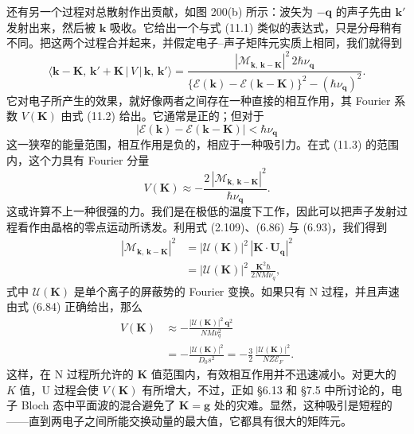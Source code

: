 还有另一个过程对总散射作出贡献，如图 200(b) 所示：波矢为 $-\mathbf{q}$ 的声子先由 $\mathbf{k}'$ 发射出来，然后被 $\mathbf{k}$ 吸收。它给出一个与式 (11.1) 类似的表达式，只是分母稍有不同。把这两个过程合并起来，并假定电子–声子矩阵元实质上相同，我们就得到
\begin{equation*}
\langle \mathbf{k}-\mathbf{K},\,\mathbf{k}'+\mathbf{K}\,|\,V\,|\,\mathbf{k},\,\mathbf{k}'\rangle
=\frac{|\mathcal{M}_{\mathbf{k},\,\mathbf{k}-\mathbf{K}}|^{2}\,2\hbar\nu_{\mathbf{q}}}{\{\mathcal{E}(\mathbf{k})-\mathcal{E}(\mathbf{k}-\mathbf{K})\}^{2}-(\hbar\nu_{\mathbf{q}})^{2}}.
\tag{11.2}
\end{equation*}
它对电子所产生的效果，就好像两者之间存在一种直接的相互作用，其 Fourier 系数 $V(\mathbf{K})$ 由式 (11.2) 给出。它通常是正的；但对于
\begin{equation*}
|\mathcal{E}(\mathbf{k})-\mathcal{E}(\mathbf{k}-\mathbf{K})|<\hbar\nu_{\mathbf{q}}
\tag{11.3}
\end{equation*}
这一狭窄的能量范围，相互作用是负的，相应于一种吸引力。在式 (11.3) 的范围内，这个力具有 Fourier 分量
\begin{equation*}
V(\mathbf{K})\approx-\frac{2\,|\mathcal{M}_{\mathbf{k},\,\mathbf{k}-\mathbf{K}}|^{2}}{\hbar\nu_{\mathbf{q}}}.
\tag{11.4}
\end{equation*}
这或许算不上一种很强的力。我们是在极低的温度下工作，因此可以把声子发射过程看作由晶格的零点运动所诱发。利用式 (2.109)、(6.86) 与 (6.93)，我们得到
\begin{align*}
|\mathcal{M}_{\mathbf{k},\,\mathbf{k}-\mathbf{K}}|^{2}
&=|\mathcal{U}(\mathbf{K})|^{2}\,|\mathbf{K}\cdot\mathbf{U}_{\mathbf{q}}|^{2}\\
&=|\mathcal{U}(\mathbf{K})|^{2}\,\frac{\mathbf{K}^{2}\hbar}{2NM\nu_{q}},
\tag{11.5}
\end{align*}
式中 $\mathcal{U}(\mathbf{K})$ 是单个离子的屏蔽势的 Fourier 变换。如果只有 N 过程，并且声速由式 (6.84) 正确给出，那么
\begin{align*}
V(\mathbf{K}) &\approx-\frac{|\mathcal{U}(\mathbf{K})|^{2}\,\mathbf{q}^{2}}{NM\nu_{q}^{2}}\\
&=-\frac{|\mathcal{U}(\mathbf{K})|^{2}}{D_{0}s^{2}}=-\frac{3}{2}\,\frac{|\mathcal{U}(\mathbf{K})|^{2}}{NZ\mathcal{E}_{F}}.
\tag{11.6}
\end{align*}
这样，在 N 过程所允许的 $\mathbf{K}$ 值范围内，有效相互作用并不迅速减小。对更大的 $K$ 值，U 过程会使 $V(\mathbf{K})$ 有所增大，不过，正如 §6.13 和 §7.5 中所讨论的，电子 Bloch 态中平面波的混合避免了 $\mathbf{K}=\mathbf{g}$ 处的灾难。显然，这种吸引是短程的——直到两电子之间所能交换动量的最大值，它都具有很大的矩阵元。

